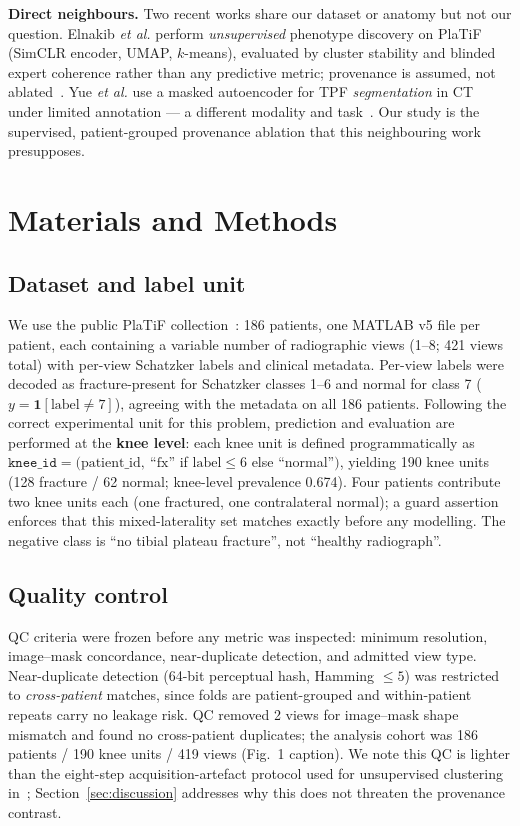 \documentclass[conference]{IEEEtran}
\begin{document}
\textbf{Direct neighbours.} Two recent works share our dataset or anatomy but not our
question. Elnakib \textit{et al.} perform \emph{unsupervised} phenotype discovery on
PlaTiF (SimCLR encoder, UMAP, $k$-means), evaluated by cluster stability and blinded
expert coherence rather than any predictive metric; provenance is assumed, not
ablated~\cite{elnakib26}. Yue \textit{et al.} use a masked autoencoder for TPF
\emph{segmentation} in CT under limited annotation --- a different modality and
task~\cite{yue25mae}. Our study is the supervised, patient-grouped provenance
ablation that this neighbouring work presupposes.

\section{Materials and Methods}

\subsection{Dataset and label unit}
We use the public PlaTiF collection~\cite{platif26}: 186 patients, one MATLAB v5
file per patient, each containing a variable number of radiographic views (1--8;
421 views total) with per-view Schatzker labels and clinical metadata. Per-view
labels were decoded as fracture-present for Schatzker classes 1--6 and normal for
class 7 ($y = \mathbf{1}[\text{label}\neq 7]$), agreeing with the metadata on all
186 patients. Following the correct experimental unit for this problem, prediction
and evaluation are performed at the \textbf{knee level}: each knee unit is defined
programmatically as $\texttt{knee\_id}=(\text{patient\_id},\ \text{``fx''}$ if
$\text{label}\le 6$ else ``normal''$)$, yielding 190 knee units (128 fracture / 62
normal; knee-level prevalence 0.674). Four patients contribute two knee units each
(one fractured, one contralateral normal); a guard assertion enforces that this
mixed-laterality set matches exactly before any modelling. The negative class is
``no tibial plateau fracture'', not ``healthy radiograph''.

\subsection{Quality control}
QC criteria were frozen before any metric was inspected: minimum resolution,
image--mask concordance, near-duplicate detection, and admitted view type.
Near-duplicate detection (64-bit perceptual hash, Hamming $\le 5$) was restricted to
\emph{cross-patient} matches, since folds are patient-grouped and within-patient
repeats carry no leakage risk. QC removed 2 views for image--mask shape mismatch and
found no cross-patient duplicates; the analysis cohort was 186 patients / 190 knee
units / 419 views (Fig.~1 caption). We note this QC is lighter than the eight-step
acquisition-artefact protocol used for unsupervised clustering in~\cite{elnakib26};
Section~\ref{sec:discussion} addresses why this does not threaten the provenance
contrast.
\end{document}
